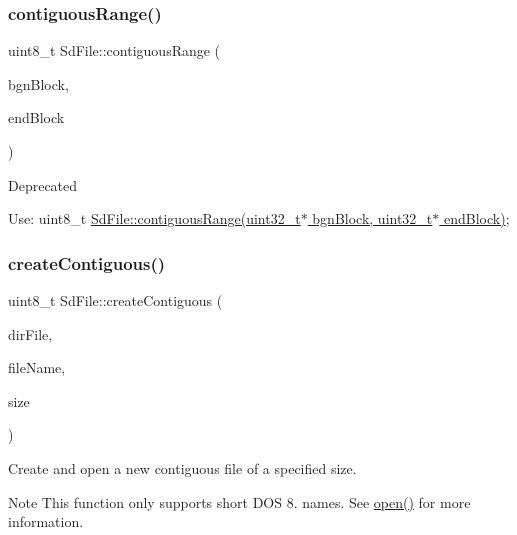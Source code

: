 \subsubsection{\texorpdfstring{contiguous\+Range()}{contiguousRange()}\hspace{0.1cm}{\footnotesize\ttfamily [2/2]}}
{\footnotesize\ttfamily uint8\+\_\+t Sd\+File\+::contiguous\+Range (\begin{DoxyParamCaption}\item[{uint32\+\_\+t \&}]{bgn\+Block,  }\item[{uint32\+\_\+t \&}]{end\+Block }\end{DoxyParamCaption})\hspace{0.3cm}{\ttfamily [inline]}}

\begin{DoxyRefDesc}{Deprecated}
\item[\hyperlink{deprecated__deprecated000001}{Deprecated}]Use\+: uint8\+\_\+t \hyperlink{class_sd_file_a3b07fc09dbcb28ae7c89c060af6a1810}{Sd\+File\+::contiguous\+Range(uint32\+\_\+t$\ast$ bgn\+Block, uint32\+\_\+t$\ast$ end\+Block)}; \end{DoxyRefDesc}
\mbox{\label{class_sd_file_a07fc5c82318f073848e706f95830e5b5}} 
\subsubsection{\texorpdfstring{create\+Contiguous()}{createContiguous()}\hspace{0.1cm}{\footnotesize\ttfamily [1/2]}}
{\footnotesize\ttfamily uint8\+\_\+t Sd\+File\+::create\+Contiguous (\begin{DoxyParamCaption}\item[{\hyperlink{class_sd_file}{Sd\+File} $\ast$}]{dir\+File,  }\item[{const char $\ast$}]{file\+Name,  }\item[{uint32\+\_\+t}]{size }\end{DoxyParamCaption})}

Create and open a new contiguous file of a specified size.

\begin{DoxyNote}{Note}
This function only supports short D\+OS 8. names. See \hyperlink{class_sd_file_a9e211ac14784f48aebb213194336f8cc}{open()} for more information.
\end{DoxyNote}


